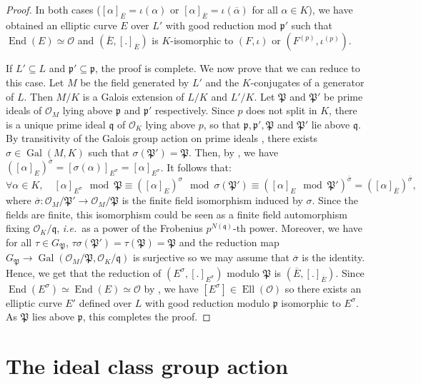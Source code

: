 \documentclass[a4paper,10pt]{report}
\theoremstyle{definition}
\theoremstyle{plain}
\theoremstyle{definition}
\newcommand{\ie}{\emph{i.e.}\ }
\newcommand{\mO}{\mathcal{O}}
\renewcommand{\(}{\left(}
\renewcommand{\)}{\right)}
\newcommand{\mf}[1]{\mathfrak{#1}}
\newcommand{\mfp}{\mathfrak{p}}
\newcommand{\mfq}{\mathfrak{q}}
\DeclareMathOperator{\End}{End}
\DeclareMathOperator{\Ell}{Ell}
\DeclareMathOperator{\Gal}{Gal}
\begin{document}
\begin{proof}
In both cases ($[\alpha]_{\overline{E}}=\iota(\alpha)$ or $[\alpha]_{\overline{E}}=\iota(\overline{\alpha})$ for all $\alpha\in K$), we have obtained an elliptic curve $E$ over $L'$ with good reduction mod $\mfp'$ such that $\End(E)\simeq \mO$ and $(\overline{E},[.]_{\overline{E}})$ is $K$-isomorphic to $(F,\iota)$ or $(F^{(p)},\iota^{(p)})$. 

If $L'\subseteq L$ and $\mfp'\subseteq\mfp$, the proof is complete. We now prove that we can reduce to this case. Let $M$ be the field generated by $L'$ and the $K$-conjugates of a generator of $L$. Then $M/K$ is a Galois extension of $L/K$ and $L'/K$.  Let $\mf{P}$ and $\mf{P}'$ be prime ideals of $\mO_M$ lying above $\mfp$ and $\mfp'$ respectively. Since $p$ does not split in $K$, there is a unique prime ideal $\mfq$ of $\mO_K$ lying above $p$, so that $\mfp, \mfp', \mf{P}$ and $\mf{P}'$ lie above $\mfq$. By transitivity of the Galois group action on prime ideals \cite[Proposition I.11]{Lang_ANT}, there exists $\sigma\in\Gal(M,K)$ such that $\sigma(\mf{P}')=\mf{P}$.  Then, by \cite[Theorem II.2.2.(a)]{Silverman2}, we have $([\alpha]_E)^\sigma=[\sigma(\alpha)]_{E^\sigma}=[\alpha]_{E^\sigma}$. It follows that:
\[\forall\alpha\in K, \quad [\alpha]_{E^\sigma} \mod\mf{P}\equiv ([\alpha]_E)^\sigma \mod\sigma(\mf{P}')\equiv \([\alpha]_E \mod\mf{P}'\)^{\overline{\sigma}}= ([\alpha]_{\overline{E}})^{\overline{\sigma}},\]
where $\overline{\sigma} :\mO_M/\mf{P}'\longrightarrow\mO_M/\mf{P}$ is the finite field isomorphism induced by $\sigma$. Since the fields are finite, this isomorphism could be seen as a finite field automorphism fixing $\mO_K/\mfq$, \ie as a power of the Frobenius $p^{N(\mfq)}$-th power. Moreover, we have for all $\tau\in G_{\mf{P}}$, $\tau\sigma(\mf{P}')=\tau(\mf{P})=\mf{P}$ and the reduction map $G_{\mf{P}}\longrightarrow\Gal(\mO_M/\mf{P},\mO_K/\mfq)$ is surjective so we may assume that $\overline{\sigma}$ is the identity.  Hence, 
we get that the reduction of $(E^{\sigma},[.]_{E^\sigma})$ modulo $\mf{P}$ is $(\overline{E},[.]_{\overline{E}})$. Since $\End(E^{\sigma})\simeq\End(E)\simeq \mO$ by \cite[Proposition II.2.1]{Silverman2}, we have $[E^\sigma]\in\Ell(\mO)$ so there exists an elliptic curve $E'$ defined over $L$ with good reduction modulo $\mfp$ isomorphic to $E^\sigma$.  As $\mf{P}$ lies above $\mfp$, this completes the proof.
\end{proof}

\section{The ideal class group action}
\end{document}
